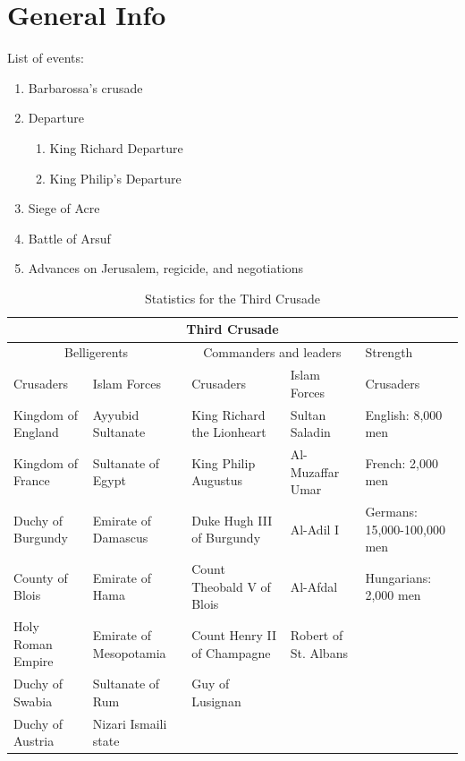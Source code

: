 \documentclass[11pt]{book}
\begin{document}
\section{General Info}
List of events:
\begin{enumerate}
\item Barbarossa's crusade \cite{CrusadeBook3}
\item Departure
\begin{enumerate}
\item King Richard Departure
\item King Philip's Departure
\end{enumerate}
\item Siege of Acre
\item Battle of Arsuf
\item Advances on Jerusalem, regicide, and negotiations
\end{enumerate}
\newpage
\setlength{\arrayrulewidth}{0.5mm}
\setlength{\tabcolsep}{24pt}
\renewcommand{\arraystretch}{2.5}
\begin{table}
\centering
\caption{Statistics for the Third Crusade}
\label{tab:statsThirdCrusade}
{
\begin{tabular}{ |p{1.5cm}|p{2cm}|p{1.5cm}|p{1cm}|p{1.5cm}|  }
\hline
\multicolumn{5}{|c|}{Third Crusade} \\
\hline
\multicolumn{2}{|c|}{Belligerents} & \multicolumn{2}{c|}{Commanders and leaders} & Strength\\
\hline
Crusaders & Islam Forces & Crusaders &Islam Forces&Crusaders \\
\hline
Kingdom of England&Ayyubid Sultanate &King Richard the Lionheart&Sultan Saladin&English: 8,000 men \\
Kingdom of France&Sultanate of Egypt&King Philip Augustus&Al-Muzaffar Umar&French: 2,000 men \\
Duchy of Burgundy&Emirate of Damascus&Duke Hugh III of Burgundy&Al-Adil I&Germans: 15,000-100,000 men \\
County of Blois&Emirate of Hama&Count Theobald V of Blois&Al-Afdal&Hungarians: 2,000 men\\
Holy Roman Empire&Emirate of Mesopotamia&Count Henry II of Champagne&Robert of St. Albans&\\
Duchy of Swabia&Sultanate of Rum&Guy of Lusignan& &\\
Duchy of Austria&Nizari Ismaili state& & &\\
\hline
\end{tabular}
}
\end{table}
\end{document}
